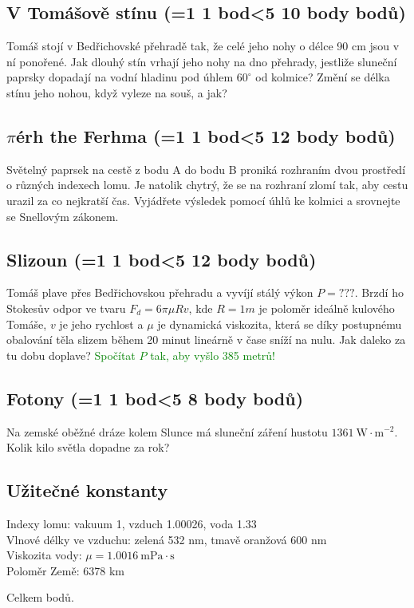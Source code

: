 \documentclass[11pt,a4paper,landscape,twocolumn]{article}
\newcounter{bodycounter}
\newcommand{\bodystring}[1]{\ifnum #1=1 1 bod\else\ifnum #1<5 #1 body\else #1 bodů\fi\fi}
\newcommand{\uloha}[3]{
\subsection{#1 (\bodystring{#2})}
#3\addtocounter{bodycounter}{#2}}
\begin{document}
\uloha{V Tomášově stínu}{10}{
Tomáš stojí v Bedřichovské přehradě tak, že celé jeho nohy o délce 90 cm jsou v ní ponořené. Jak dlouhý stín vrhají jeho nohy na dno přehrady, jestliže sluneční paprsky dopadají na vodní hladinu pod úhlem $60^\circ$ od kolmice? Změní se délka stínu jeho nohou, když vyleze na souš, a jak?
}

\uloha{$\pi$érh the Ferhma}{12}{
Světelný paprsek na cestě z bodu A do bodu B proniká rozhraním dvou prostředí o různých indexech lomu. Je natolik chytrý, že se na rozhraní zlomí tak, aby cestu urazil za co nejkratší čas. Vyjádřete výsledek pomocí úhlů ke kolmici a srovnejte se Snellovým zákonem.
}

\uloha{Slizoun}{12}{
Tomáš plave přes Bedřichovskou přehradu a vyvíjí stálý výkon $P = ???$. Brzdí ho Stokesův odpor ve tvaru $F_d = 6\pi \mu Rv$, kde $R = 1 m$ je poloměr ideálně kulového Tomáše, $v$ je jeho rychlost a $\mu$ je dynamická viskozita, která se díky postupnému obalování těla slizem během 20 minut lineárně v čase sníží na nulu. Jak daleko za tu dobu doplave? \textcolor{green}{Spočítat $P$ tak, aby vyšlo 385 metrů!}
}

\uloha{Fotony}{8}{
Na zemské oběžné dráze kolem Slunce má sluneční záření hustotu $1361~\mathrm{W\cdot m^{-2}}$. Kolik kilo světla dopadne za rok?
}

\subsection*{Užitečné konstanty}
Indexy lomu: vakuum 1, vzduch 1.00026, voda 1.33 \\
Vlnové délky ve vzduchu: zelená 532 nm, tmavě oranžová 600 nm\\
Viskozita vody: $\mu = 1.0016~\mathrm{mPa\cdot s}$\\
Poloměr Země: 6378 km

\newpage Celkem  bodů.
\end{document}
